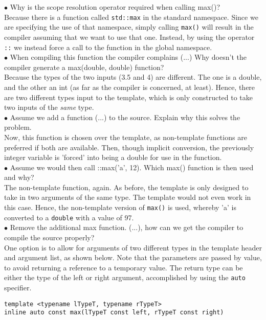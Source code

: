 $\bullet$ Why is the scope resolution operator required when calling max()? \\
Because there is a function called \texttt{std::max} in the standard namespace. Since we are specifying the use of that namespace, simply calling \texttt{max()} will result in the compiler assuming that we want to use that one. Instead, by using the operator \texttt{::} we instead force a call to the function in the global namespace. \\

$\bullet$ When compiling this function the compiler complains (...) Why doesn't the compiler generate a max(double, double) function? \\
Because the types of the two inputs (3.5 and 4) are different. The one is a double, and the other an int (as far as the compiler is concerned, at least). Hence, there are two different types input to the template, which is only constructed to take two inputs of the \textit{same} type.\\

$\bullet$ Assume we add a function (...) to the source. Explain why this solves the problem. \\
Now, this function is chosen over the template, as non-template functions are preferred if both are available. Then, though implicit conversion, the previously integer variable is 'forced' into being a double for use in the function. \\

$\bullet$ Assume we would then call ::max('a', 12). Which max() function is then used and why? \\
The non-template function, again. As before, the template is only designed to take in two arguments of the same type. The template would not even work in this case. Hence, the non-template version of \texttt{max()} is used, whereby 'a' is converted to a \texttt{double} with a value of 97. \\

$\bullet$ Remove the additional max function. (...), how can we get the compiler to compile the source properly? \\
One option is to allow for arguments of two different types in the template header and argument list, as shown below. Note that the parameters are passed by value, to avoid returning a reference to a temporary value. The return type can be either the type of the left or right argument, accomplished by using the \texttt{auto} specifier.
\begin{lstlisting}[style=in]
template <typename lTypeT, typename rTypeT>
inline auto const max(lTypeT const left, rTypeT const right)
\end{lstlisting}

